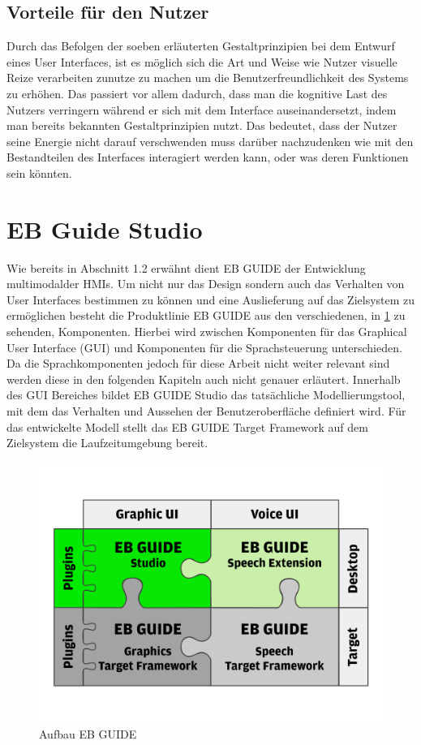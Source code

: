 \subsection*{Vorteile für den Nutzer}
Durch das Befolgen der soeben erläuterten Gestaltprinzipien bei dem Entwurf eines User Interfaces, ist es möglich sich die Art und Weise wie Nutzer visuelle Reize verarbeiten zunutze zu machen um die Benutzerfreundlichkeit des Systems zu erhöhen.
Das passiert vor allem dadurch, dass man die kognitive Last des Nutzers verringern während er sich mit dem Interface auseinandersetzt, indem man bereits bekannten Gestaltprinzipien nutzt.
Das bedeutet, dass der Nutzer seine Energie nicht darauf verschwenden muss darüber nachzudenken wie mit den Bestandteilen des Interfaces interagiert werden kann, oder was deren Funktionen sein könnten\cite{Knight.2019c}.

\section{EB Guide Studio}
Wie bereits in Abschnitt 1.2 erwähnt dient EB GUIDE der Entwicklung multimodalder HMIs.
Um nicht nur das Design sondern auch das Verhalten von User Interfaces bestimmen zu können und eine Auslieferung auf das Zielsystem zu ermöglichen besteht die Produktlinie EB GUIDE aus den verschiedenen, in \cref{fig:guide_puzzle} zu sehenden, Komponenten.
Hierbei wird zwischen Komponenten für das Graphical User Interface (GUI) und Komponenten für die Sprachsteuerung unterschieden.
Da die Sprachkomponenten jedoch für diese Arbeit nicht weiter relevant sind werden diese in den folgenden Kapiteln auch nicht genauer erläutert.
Innerhalb des GUI Bereiches bildet EB GUIDE Studio das tatsächliche Modellierungstool, mit dem das Verhalten und Aussehen der Benutzeroberfläche definiert wird.
Für das entwickelte Modell stellt das EB GUIDE Target Framework auf dem Zielsystem die Laufzeitumgebung bereit.\cite{.c}

\begin{figure} [H]
\begin{center}
  \includegraphics[scale=0.7]{figures/EB_GUIDE_Puzzle.png}
  \caption{Aufbau EB GUIDE}
  \label{fig:guide_puzzle}
\end{center}
\end{figure}

